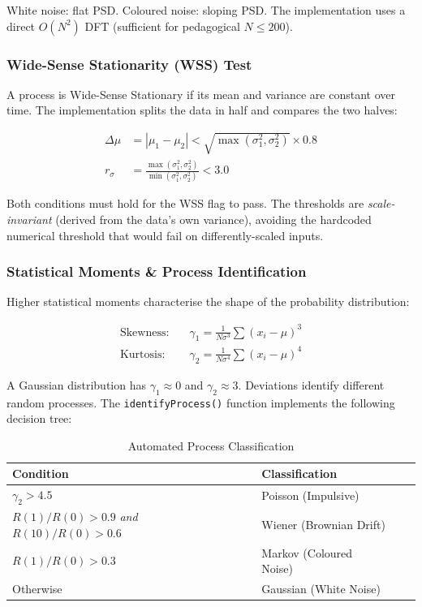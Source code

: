 \documentclass[12pt, a4paper]{article}
\begin{document}
White noise: flat PSD. Coloured noise: sloping PSD. The implementation uses
a direct $O(N^2)$ DFT (sufficient for pedagogical $N \leq 200$).

\subsubsection{Wide-Sense Stationarity (WSS) Test}

A process is Wide-Sense Stationary if its mean and variance are constant over time.
The implementation splits the data in half and compares the two halves:

\begin{align}
  \Delta\mu &= |\mu_1 - \mu_2| < \sqrt{\max(\sigma_1^2, \sigma_2^2)} \times 0.8 \\
  r_\sigma  &= \frac{\max(\sigma_1^2, \sigma_2^2)}{\min(\sigma_1^2, \sigma_2^2)} < 3.0
\end{align}

Both conditions must hold for the WSS flag to pass. The thresholds are
\emph{scale-invariant} (derived from the data's own variance), avoiding the hardcoded
numerical threshold that would fail on differently-scaled inputs.

\subsubsection{Statistical Moments \& Process Identification}

Higher statistical moments characterise the shape of the probability distribution:

\begin{align}
  \text{Skewness:} \quad & \gamma_1 = \frac{1}{N\sigma^3}\sum(x_i - \mu)^3 \\
  \text{Kurtosis:} \quad & \gamma_2 = \frac{1}{N\sigma^4}\sum(x_i - \mu)^4
\end{align}

A Gaussian distribution has $\gamma_1 \approx 0$ and $\gamma_2 \approx 3$.
Deviations identify different random processes. The \texttt{identifyProcess()} function
implements the following decision tree:

\begin{table}[h!]
  \centering
  \caption{Automated Process Classification}
  \begin{tabular}{llll}
    \toprule
    \textbf{Condition} & \textbf{Classification} \\
    \midrule
    $\gamma_2 > 4.5$ & Poisson (Impulsive) \\
    $R(1)/R(0) > 0.9$ \emph{and} $R(10)/R(0) > 0.6$ & Wiener (Brownian Drift) \\
    $R(1)/R(0) > 0.3$ & Markov (Coloured Noise) \\
    Otherwise & Gaussian (White Noise) \\
    \bottomrule
  \end{tabular}
\end{table}
\end{document}
